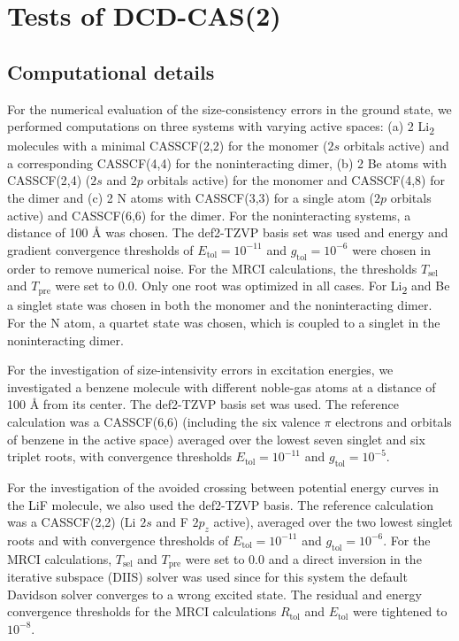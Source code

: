 \section{Tests of DCD-CAS(2)}
\subsection{Computational details}
For the numerical evaluation of the size-consistency errors in the ground state, we performed computations on three systems with varying active spaces: (a) 2 Li\textsubscript{2} molecules with a minimal CASSCF(2,2) for the monomer ($2s$ orbitals active) and a corresponding CASSCF(4,4) for the noninteracting dimer, (b) 2 Be atoms with CASSCF(2,4) ($2s$ and $2p$ orbitals active) for the monomer and CASSCF(4,8) for the dimer and (c) 2 N atoms with CASSCF(3,3) for a single atom ($2p$ orbitals active) and CASSCF(6,6) for the dimer. For the noninteracting systems, a distance of 100 Å was chosen. The def2-TZVP basis set\cite{WeigeA_2005_3297} was used and energy and gradient convergence thresholds of $E_\text{tol} = 10^{-11}$ and $g_\text{tol}=10^{-6}$ were chosen in order to remove numerical noise. 
For the MRCI calculations, the thresholds $T_\text{sel}$ and $T_\text{pre}$ were set to 0.0. Only one root was optimized in all cases. For Li\textsubscript{2} and Be a singlet state was chosen in both the monomer and the noninteracting dimer. For the N atom, a quartet state was chosen, which is coupled to a singlet in the noninteracting dimer.

For the investigation of size-intensivity errors in excitation energies, we investigated a benzene molecule with different noble-gas atoms at a distance of 100 Å from its center. The def2-TZVP basis set was used. The reference calculation was a CASSCF(6,6) (including the six valence $\pi$ electrons and orbitals of benzene in the active space) averaged over the lowest seven singlet and six triplet roots, with convergence thresholds $E_\text{tol} = 10^{-11}$ and $g_\text{tol}=10^{-5}$.

For the investigation of the avoided crossing between potential energy curves in the LiF molecule, we also used the def2-TZVP basis. The reference calculation was a CASSCF(2,2) (Li $2s$ and F $2p_z$ active), averaged over the two lowest singlet roots and with convergence thresholds of $E_\text{tol} = 10^{-11}$ and $g_\text{tol}=10^{-6}$. For the MRCI calculations, $T_\text{sel}$ and $T_\text{pre}$ were set to 0.0 and a direct inversion in the iterative subspace (DIIS)\cite{Pulay_1980_393} solver was used since for this system the default Davidson solver\cite{David_1975_87} converges to a wrong excited state. The residual and energy convergence thresholds for the MRCI calculations $R_\text{tol}$ and $E_\text{tol}$ were tightened to $10^{-8}$.

